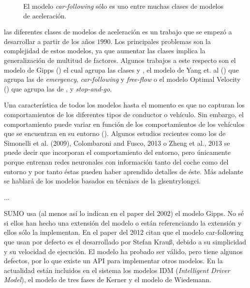\begin{figure}
	\caption{El modelo \textit{car-following} sólo es uno entre muchas clases de modelos de aceleración.}
	\label{fig:acceleration-model-classes}
\end{figure}

 las diferentes clases de modelos de aceleración es un trabajo que se empezó a desarrollar a partir de los años $1990$. Los principales problemas son la complejidad de estos modelos, ya que aumentar las clases implica la generalización de multitud de factores. Algunos trabajos a este respecto son el modelo de Gipps (\cite{Gipps1981}) el cual agrupa las clases \textit{} y \textit{}, el modelo de Yang et. al (\cite{Yang1996}) que agrupa las de \textit{emergency}, \textit{car-following} y \textit{free-flow} o el modelo Optimal Velocity (\cite{Bando1998}) que agrupa las de \textit{}, \textit{} y \textit{stop-and-go}.

Una característica de todos los modelos hasta el momento es que no capturan los comportamientos de los diferentes tipos de conductor o vehículo. Sin embargo, el comportamiento puede variar en función de los comportamientos de los vehículos que se encuentran en su entorno (\cite{Tordeux2010}). Algunos estudios recientes como los de Simonelli et al. (2009), Colombaroni and Fusco, 2013 o Zheng et al., 2013 se puede decir que incorporan el comportamiento del entorno, pero únicamente porque entrenan redes neuronales con información tanto del coche como del entorno y por tanto éstas pueden haber aprendido detalles de éste. Más adelante se hablará de los modelos basados en técniacs de la glsentrylong{ci}.

...

SUMO usa (al menos así lo indican en el paper del 2002) el modelo Gipps\cite{krajzewicz2002sumo}. No sé si ellos han hecho una extensión del modelo o están referenciando la extensión y ellos sólo la implementan. En el paper del 2012 citan que el modelo car-following que usan por defecto es el desarrollado por Stefan Krauß\cite{jin2016evaluation}, debido a su simplicidad y su velocidad de ejecución. El modelo ha probado ser válido, pero tiene algunos defectos, por lo que existe un API para implementar otros modelos. En la actualidad están incluidos en el sistema los modelos IDM\cite{treiber2000congested} (\textit{Intelligent Driver Model}), el modelo de tres fases de Kerner\cite{kerner2008testbed} y el modelo de Wiedemann\cite{wiedemann1974simulation}.

